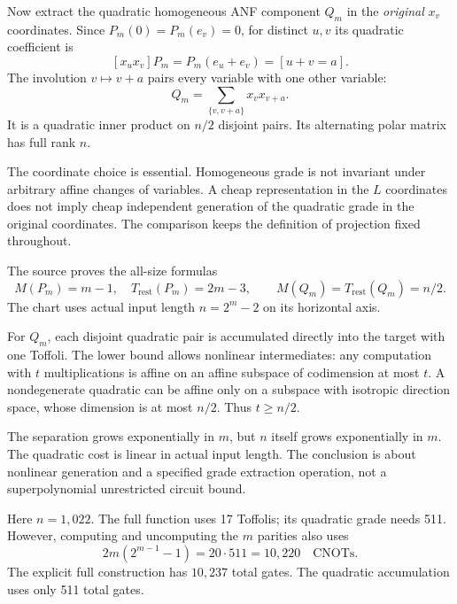 Now extract the quadratic homogeneous ANF component $Q_m$ in the
\emph{original} $x_v$ coordinates. Since $P_m(0)=P_m(e_v)=0$, for distinct
$u,v$ its quadratic coefficient is
\[
 [x_ux_v]P_m=P_m(e_u+e_v)=[u+v=a].
\]
The involution $v\mapsto v+a$ pairs every variable with one other variable:
\[
 Q_m=\sum_{\{v,v+a\}}x_vx_{v+a}.
\]
It is a quadratic inner product on $n/2$ disjoint pairs. Its alternating
polar matrix has full rank $n$.

The coordinate choice is essential. Homogeneous grade is not invariant
under arbitrary affine changes of variables. A cheap representation in
the $L$ coordinates does not imply cheap independent generation of the
quadratic grade in the original coordinates. The comparison keeps the
definition of projection fixed throughout.


The source proves the all-size formulas
\[
 M(P_m)=m-1,\quad T_{\mathrm{rest}}(P_m)=2m-3,\qquad
 M(Q_m)=T_{\mathrm{rest}}(Q_m)=n/2.
\]
The chart uses actual input length $n=2^m-2$ on its horizontal axis.


For $Q_m$, each disjoint quadratic pair is accumulated directly into the
target with one Toffoli. The lower bound allows nonlinear intermediates:
any computation with $t$ multiplications is affine on an affine subspace
of codimension at most $t$. A nondegenerate quadratic can be affine only
on a subspace with isotropic direction space, whose dimension is at most
$n/2$. Thus $t\ge n/2$.

The separation grows exponentially in $m$, but $n$ itself grows
exponentially in $m$. The quadratic cost is linear in actual input length.
The conclusion is about nonlinear generation and a specified grade
extraction operation, not a superpolynomial unrestricted circuit bound.


Here $n=1,022$. The full function uses 17 Toffolis; its quadratic grade
needs 511. However, computing and uncomputing the $m$ parities also uses
\[
 2m(2^{m-1}-1)=20\cdot511=10,220\quad\text{CNOTs}.
\]
The explicit full construction has $10,237$ total gates. The quadratic
accumulation uses only 511 total gates.

